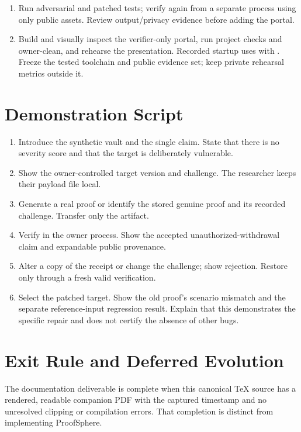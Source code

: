 \documentclass[11pt]{article}
\newcommand{\filepath}[1]{\path{#1}}
\begin{document}
\begin{enumerate}
\begin{verbatim}
proofsphere demo-witness \
  --out .proofsphere-private/reference.bin
proofsphere prove --scenario vault-vulnerable-v1 \
  --challenge evidence/demo/challenge.json \
  --witness .proofsphere-private/reference.bin \
  --out evidence/demo/vulnerable.psproof
proofsphere verify --scenario vault-vulnerable-v1 \
  --challenge evidence/demo/challenge.json \
  --proof evidence/demo/vulnerable.psproof --json
\end{verbatim}
\item Run adversarial and patched tests; verify again from a separate process using only public assets. Review output/privacy evidence before adding the portal.
\item Build and visually inspect the verifier-only portal, run project checks and owner-clean, and rehearse the presentation. Recorded startup uses \filepath{target/release/proofsphere-portal} with . Freeze the tested toolchain and public evidence set; keep private rehearsal metrics outside it.
\end{enumerate}

\section{Demonstration Script}
\begin{enumerate}
\item Introduce the synthetic vault and the single claim. State that there is no severity score and that the target is deliberately vulnerable.
\item Show the owner-controlled target version and challenge. The researcher keeps their payload file local.
\item Generate a real proof or identify the stored genuine proof and its recorded challenge. Transfer only the  artifact.
\item Verify in the owner process. Show the accepted unauthorized-withdrawal claim and expandable public provenance.
\item Alter a copy of the receipt or change the challenge; show rejection. Restore only through a fresh valid verification.
\item Select the patched target. Show the old proof's scenario mismatch and the separate reference-input regression result. Explain that this demonstrates the specific repair and does not certify the absence of other bugs.
\end{enumerate}

\section{Exit Rule and Deferred Evolution}
The documentation deliverable is complete when this canonical TeX source has a rendered, readable companion PDF with the captured timestamp and no unresolved clipping or compilation errors. That completion is distinct from implementing ProofSphere.
\end{document}
